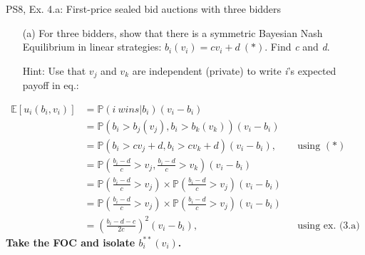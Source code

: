 \begin{frame}{PS8, Ex. 4.a: First-price sealed bid auctions with three bidders}
    \begin{itemize}
      \item[(a)] For three bidders, show that there is a symmetric Bayesian Nash Equilibrium in linear strategies: $b_i(v_i) = cv_i + d\ (*)$. Find \textit{c} and \textit{d}.
      \item[Hint:] Use that $v_j$ and $v_k$ are independent (private) to write \textit{i}'s expected payoff in eq.:
    \end{itemize}
    \vspace{-10pt}
    \begin{align*}
      \mathbb{E}[u_i(b_i,v_i)]
      &=\mathbb{P}(i\ wins|b_i)(v_i-b_i)\\
      &=\mathbb{P}\left(b_i>b_j(v_j),b_i>b_k(v_k)\right)(v_i-b_i)\\
      &=\mathbb{P}(b_i>cv_j+d,b_i>cv_k+d)(v_i-b_i),&&\text{using }(*)\\
      &=\mathbb{P}\left(\frac{b_i-d}{c}>v_j,\frac{b_i-d}{c}>v_k\right)(v_i-b_i)\\
      &=\mathbb{P}\left(\frac{b_i-d}{c}>v_j\right)\times\mathbb{P}\left(\frac{b_i-d}{c}>v_j\right)(v_i-b_i)\\
      &=\mathbb{P}\left(\frac{b_i-d}{c}>v_j\right)\times\mathbb{P}\left(\frac{b_i-d}{c}>v_j\right)(v_i-b_i)\\
      &=\left(\frac{b_i-d-c}{2c}\right)^2(v_i-b_i),&&\text{using ex. (3.a)}
    \end{align*}
    \vspace{-8pt}
    \textbf{Take the FOC and isolate $b_i^{**}(v_i)$.}
    \vfill\null
\end{frame}
